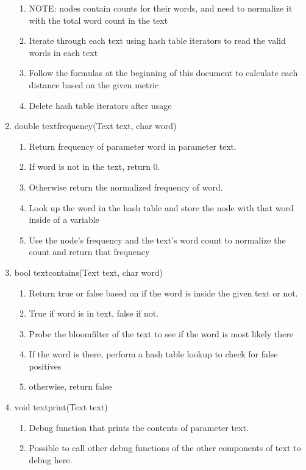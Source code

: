 \documentclass[11pt]{article}
\begin{document}
\begin{enumerate}
\begin{enumerate}
	\item NOTE: nodes contain counts for their words, and need to normalize it with the total word count in the text
	\item Iterate through each text using hash table iterators to read the valid words in each text
	\item Follow the formulas at the beginning of this document to calculate each distance based on the given metric
	\item Delete hash table iterators after usage
	\end{enumerate}
\item double textfrequency(Text text, char word)
	\begin{enumerate}
	\item Return frequency of parameter word in parameter text. 
	\item If word is not in the text, return 0.
	\item Otherwise return the normalized frequency of word.
	\item Look up the word in the hash table and store the node with that word inside of a variable
	\item Use the node's frequency and the text's word count to normalize the count and return that frequency
	\end{enumerate}
\item bool textcontains(Text text, char word)
	\begin{enumerate}
	\item Return true or false based on if the word is inside the given text or not.
	\item True if word is in text, false if not.
	\item Probe the bloomfilter of the text to see if the word is most likely there
	\item If the word is there, perform a hash table lookup to check for false positives
	\item otherwise, return false
	\end{enumerate}
\item void textprint(Text text)
	\begin{enumerate}
	\item Debug function that prints the contents of parameter text.
	\item Possible to call other debug functions of the other components of text to debug here.
	\end{enumerate}
\end{enumerate}
\end{document}
